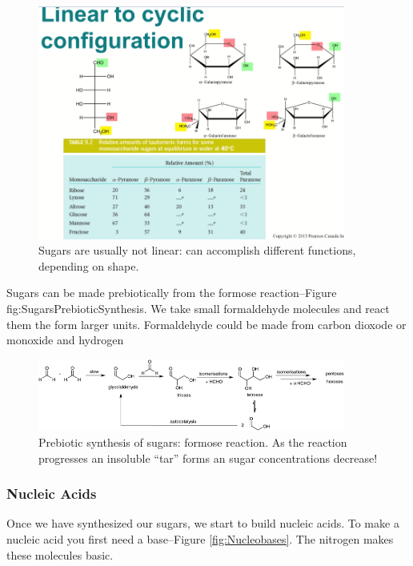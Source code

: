 \documentclass[]{article}
\begin{document}
\begin{figure}[H]
	\caption[Sugars can accomplish different functions, depending on shape.]{Sugars are usually not linear: can accomplish different functions, depending on shape.}\label{fig:SugarTautomers} 
	\includegraphics[width=0.9\textwidth]{SugarTautomers}
\end{figure}

Sugars can be made prebiotically from the formose reaction--Figure fig:{SugarsPrebioticSynthesis}. We take small formaldehyde molecules and react them the form larger units. Formaldehyde could be made from carbon dioxode or monoxide and hydrogen

\begin{figure}[H]
	\caption[Prebiotic synthesis of sugars: formose reaction]{Prebiotic synthesis of sugars: formose reaction. As the reaction progresses an insoluble “tar” forms an sugar concentrations decrease!}\label{fig:SugarsPrebioticSynthesis} 
	\includegraphics[width=0.9\textwidth]{SugarsPrebioticSynthesis}
\end{figure}


\subsubsection{Nucleic Acids}

Once we have synthesized our sugars, we start to build nucleic acids. To make a nucleic acid you first need a base--Figure \ref{fig:Nucleobases}. The nitrogen makes these molecules basic.
\end{document}
